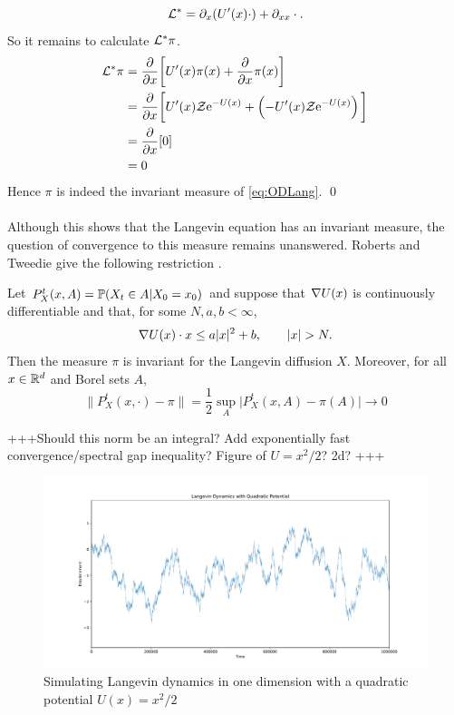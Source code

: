 \[\L^* = \partial_x(U'(x)\cdot)+\partial_{xx}\cdot . \]
So it remains to calculate \(\L^*\pi\).
\begin{align*}
\L^*\pi &= \pd{}{x}\bigg\lbrack U'(x)\pi(x) + \pd{}{x}\pi(x)\bigg\rbrack\\
		&= \pd{}{x}\bigg\lbrack U'(x)\mathcal{Z}\e^{-U(x)}+ \left(-U'(x)\mathcal{Z}\e^{-U(x)}\right)\bigg\rbrack\\
		&= \pd{}{x}\lbrack 0 \rbrack\\
		&= 0
\end{align*}
Hence \(\pi\) is indeed the invariant measure of \eqref{eq:ODLang}. \qed
\\
\\
Although this shows that the Langevin equation has an invariant measure, the question of convergence to this measure remains unanswered. Roberts and Tweedie give the following restriction \cite{RT96}.
\begin{theorem}
	Let \(P^t_X(x,A) = \P(X_t\in A | X_0 =x_0)\) and suppose that \(\grad U(x)\) is continuously differentiable and that, for some \(N,a,b < \infty\),
	\[\grad U(x)\cdot x \leq a|x|^2 + b, \qquad |x|>N. \]
	Then the measure \(\pi\) is invariant for the Langevin diffusion \(X\). Moreover, for all \(x \in \R^d \) and Borel sets \(A\),
	\[\|P^t_X(x,\cdot) - \pi \| = \frac{1}{2}\sup_A \big|P^t_X(x,A)-\pi(A)\big| \to 0\]

\end{theorem}
+++Should this norm be an integral? Add exponentially fast convergence/spectral gap inequality? Figure of \(U=x^2/2\)? 2d?  +++\\

\begin{figure}[ht]
	\centering
		\includegraphics[width=\linewidth]{quadraticLD.pdf}
	\caption{Simulating Langevin dynamics in one dimension with a quadratic potential \(U(x)=x^2/2\)}
	\label{fig:quadLD}
\end{figure}


